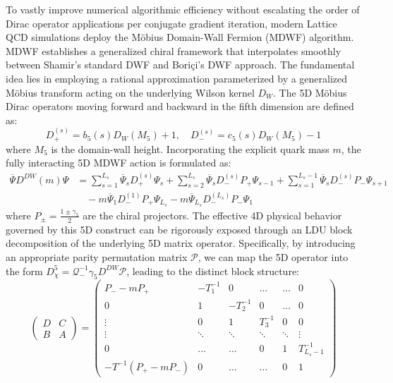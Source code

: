 To vastly improve numerical algorithmic efficiency without escalating the order of Dirac operator applications per conjugate gradient iteration, modern Lattice QCD simulations deploy the M\"obius Domain-Wall Fermion (MDWF) algorithm. MDWF establishes a generalized chiral framework that interpolates smoothly between Shamir's standard DWF and Bori\c{c}i's DWF approach. The fundamental idea lies in employing a rational approximation parameterized by a generalized M\"obius transform acting on the underlying Wilson kernel $D_W$.
The 5D M\"obius Dirac operators moving forward and backward in the fifth dimension are defined as:
\begin{equation}
D_{+}^{(s)} = b_5(s)D_W(M_5) + 1, \quad D_{-}^{(s)} = c_5(s)D_W(M_5) - 1
\end{equation}
where $M_5$ is the domain-wall height. Incorporating the explicit quark mass $m$, the fully interacting 5D MDWF action is formulated as:
\begin{equation}
\begin{split}
\overline{\Psi} D^{DW}(m) \Psi &= \sum_{s=1}^{L_s} \overline{\Psi}_s D_{+}^{(s)} \Psi_s + \sum_{s=2}^{L_s} \overline{\Psi}_s D_{-}^{(s)} P_+ \Psi_{s-1} + \sum_{s=1}^{L_s-1} \overline{\Psi}_s D_{-}^{(s)} P_- \Psi_{s+1} \\
&\quad - m \overline{\Psi}_1 D_{-}^{(1)} P_+ \Psi_{L_s} - m \overline{\Psi}_{L_s} D_{-}^{(L_s)} P_- \Psi_1
\end{split}
\label{eq:mdwf_5d_action}
\end{equation}
where $P_\pm = \frac{1 \pm \gamma_5}{2}$ are the chiral projectors. The effective 4D physical behavior governed by this 5D construct can be rigorously exposed through an LDU block decomposition of the underlying 5D matrix operator. Specifically, by introducing an appropriate parity permutation matrix $\mathcal{P}$, we can map the 5D operator into the form $D_\chi^5 = \mathcal{Q}_-^{-1} \gamma_5 D^{DW} \mathcal{P}$, leading to the distinct block structure:
\begin{equation}
\begin{pmatrix} D & C \\ B & A \end{pmatrix} =
\left( \begin{array}{c|ccccc}
P_- - m P_+ & -T_1^{-1} & 0 & \dots & \dots & 0 \\
\hline
0 & 1 & -T_2^{-1} & 0 & \dots & 0 \\
\vdots & 0 & 1 & T_3^{-1} & 0 & 0 \\
\vdots & \ddots & \ddots & \ddots & \ddots & \vdots \\
0 & \dots & \dots & 0 & 1 & T_{L_s-1}^{-1} \\
-T^{-1} (P_+ - m P_-) & 0 & \dots & \dots & 0 & 1
\end{array} \right)
\end{equation}
